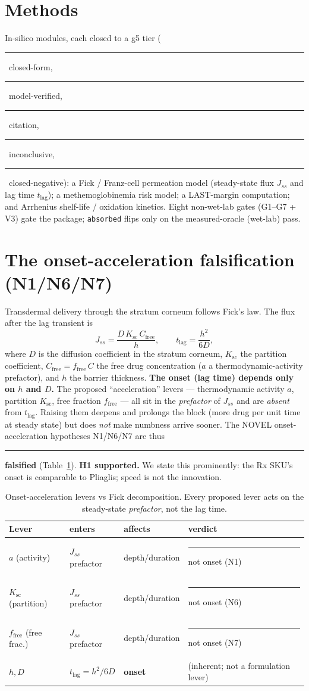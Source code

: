 \documentclass[11pt,a4paper]{article}
\newcommand{\tierdisc}[1]{\textcolor{#1}{\rule[0.05ex]{1.0ex}{1.0ex}}}
\newcommand{\tierBlue}{\tierdisc{blue!70!black}}
\newcommand{\tierGreen}{\tierdisc{green!60!black}}
\newcommand{\tierYellow}{\tierdisc{yellow!85!black}}
\newcommand{\tierOrange}{\tierdisc{orange!90!black}}
\newcommand{\tierRed}{\tierdisc{red!80!black}}
\begin{document}
\section{Methods}
\label{sec:methods}
In-silico modules, each closed to a g5 tier
(\tierBlue{}~closed-form, \tierGreen{}~model-verified, \tierYellow{}~citation,
\tierOrange{}~inconclusive, \tierRed{}~closed-negative): a Fick / Franz-cell
permeation model (steady-state flux $J_{ss}$ and lag time $t_{\mathrm{lag}}$);
a methemoglobinemia risk model; a LAST-margin computation; and Arrhenius
shelf-life / oxidation kinetics. Eight non-wet-lab gates (G1--G7 + V3) gate the
package; \texttt{absorbed} flips only on the measured-oracle (wet-lab) pass.

\section{The onset-acceleration falsification (N1/N6/N7)}
\label{sec:onset}
Transdermal delivery through the stratum corneum follows Fick's law. The
flux after the lag transient is
\begin{equation}
J_{ss} = \frac{D\,K_{\mathrm{sc}}\,C_{\mathrm{free}}}{h},
\qquad
t_{\mathrm{lag}} = \frac{h^{2}}{6D},
\label{eq:fick}
\end{equation}
where $D$ is the diffusion coefficient in the stratum corneum, $K_{\mathrm{sc}}$
the partition coefficient, $C_{\mathrm{free}}=f_{\mathrm{free}}\,C$ the free
drug concentration ($a$ a thermodynamic-activity prefactor), and $h$ the barrier
thickness. \textbf{The onset (lag time) depends only on $h$ and $D$.} The
proposed ``acceleration'' levers --- thermodynamic activity $a$, partition
$K_{\mathrm{sc}}$, free fraction $f_{\mathrm{free}}$ --- all sit in the
\emph{prefactor} of $J_{ss}$ and are \emph{absent} from $t_{\mathrm{lag}}$.
Raising them deepens and prolongs the block (more drug per unit time at
steady state) but does \emph{not} make numbness arrive sooner. The NOVEL
onset-acceleration hypotheses N1/N6/N7 are thus \tierRed{} \textbf{falsified}
(Table~\ref{tab:onset}). \textbf{H1 supported.} We state this prominently:
the Rx SKU's onset is comparable to Pliaglis; speed is not the innovation.

\begin{table}[t]
\centering
\caption{Onset-acceleration levers vs Fick decomposition. Every proposed lever
acts on the steady-state \emph{prefactor}, not the lag time.}
\label{tab:onset}
\small
\begin{tabular}{@{}llll@{}}
\toprule
Lever & enters & affects & verdict \\
\midrule
$a$ (activity) & $J_{ss}$ prefactor & depth/duration & \tierRed{} not onset (N1) \\
$K_{\mathrm{sc}}$ (partition) & $J_{ss}$ prefactor & depth/duration & \tierRed{} not onset (N6) \\
$f_{\mathrm{free}}$ (free frac.) & $J_{ss}$ prefactor & depth/duration & \tierRed{} not onset (N7) \\
$h, D$ & $t_{\mathrm{lag}}=h^2/6D$ & \textbf{onset} & (inherent; not a formulation lever) \\
\bottomrule
\end{tabular}
\end{table}
\end{document}
